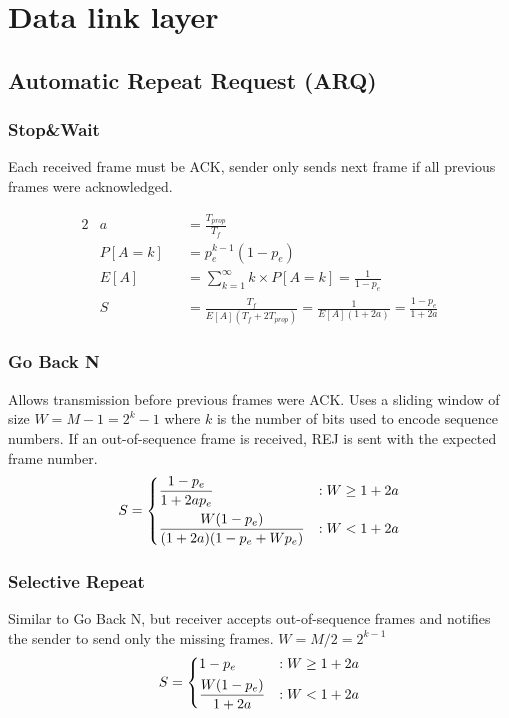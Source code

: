 \documentclass{form}
\begin{document}
\noindent%
\begin{minipage}[c]{0.49\textwidth}
    \section*{Data link layer}
    \subsection*{Automatic Repeat Request (ARQ)}
    \subsubsection*{Stop\&Wait}
    Each received frame must be ACK, sender only sends next frame if all previous frames were acknowledged.

    \begin{center}
        \begin{alignat*}{2}
            & a      &&= \frac{T_{prop}}{T_f} \\
            & P[A=k] &&= p_e^{k-1} (1-p_e)\\
            & E[A]   &&= \sum_{k=1}^{\infty}{k \times P[A=k]} = \frac{1}{1-p_e}\\
            & S      &&= \frac{T_f}{E[A](T_f+2T_{prop})} = \frac{1}{E[A](1+2a)} = \frac{1-p_e}{1+2a}
        \end{alignat*}
    \end{center}
\end{minipage}
\begin{minipage}[c]{0.49\textwidth}
    \subsubsection*{Go Back N}
    Allows transmission before previous frames were ACK. Uses a sliding window of size $W = M-1 = 2^k-1$ where $k$ is the number of bits used to encode sequence numbers.
    If an out-of-sequence frame is received, REJ is sent with the expected frame number.
    \begin{equation*}
        S = \begin{dcases}
            \frac{1-p_e}{1+2ap_e}               & : W \geq 1+2a \\
            \frac{W(1-p_e)}{(1+2a)(1-p_e+Wp_e)} & : W < 1+2a
        \end{dcases}
    \end{equation*}

    \subsubsection*{Selective Repeat}
    Similar to Go Back N, but receiver accepts out-of-sequence frames and notifies the sender to send only the missing frames.
    $W = M/2 = 2^{k-1}$
    \begin{equation*}
        S = \begin{dcases}
            1-p_e                 & : W \geq 1+2a \\
            \frac{W(1-p_e)}{1+2a} & : W < 1+2a
        \end{dcases}
    \end{equation*}
\end{minipage}
\end{document}
